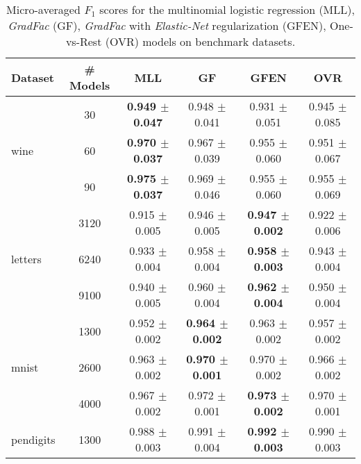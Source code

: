 \documentclass{standalone}
\begin{document}



\begin{table*}[t]
\label{exp-results}
\centering
\caption{Micro-averaged $F_{1}$ scores for the multinomial logistic regression (MLL), \emph{GradFac} (GF), \emph{GradFac} with \emph{Elastic-Net} regularization (GFEN), One-vs-Rest (OVR) models on benchmark datasets.}
\vskip 0.15in
\begin{small}
\begin{sc}
{\renewcommand{\arraystretch}{1.2}%
\begin{tabular}{|l|c|c|c|c|c|}
\hline
\abovespace\belowspace
Dataset		& \# Models 	& MLL & GF & GFEN 	& OVR  \\
\hline\hline
\multirow{3}{*}{wine}
	& 30    		& \textbf{0.949 $\pm$ 0.047} & 0.948 $\pm$ 0.041 & 0.931 $\pm$ 0.051 & 0.945 $\pm$ 0.085\\
	& 60	  		& \textbf{0.970 $\pm$ 0.037} & 0.967 $\pm$ 0.039 & 0.955 $\pm$ 0.060 & 0.951 $\pm$ 0.067\\
	& 90    		& \textbf{0.975 $\pm$ 0.037} & 0.969 $\pm$ 0.046 & 0.955 $\pm$ 0.060 & 0.955 $\pm$ 0.069\\
\hline
\multirow{3}{*}{letters}
	& 3120			& 0.915 $\pm$ 0.005 & 0.946 $\pm$ 0.005 & \textbf{0.947 $\pm$ 0.002} & 0.922 $\pm$ 0.006\\
	& 6240	 		& 0.933 $\pm$ 0.004 & 0.958 $\pm$ 0.004 & \textbf{0.958 $\pm$ 0.003} & 0.943 $\pm$ 0.004\\
	& 9100 			& 0.940 $\pm$ 0.005 & 0.960 $\pm$ 0.004 & \textbf{0.962 $\pm$ 0.004} & 0.950 $\pm$ 0.004\\
\hline
\multirow{3}{*}{mnist}
	& 1300			& 0.952 $\pm$ 0.002 & \textbf{0.964 $\pm$ 0.002} 	& 0.963 $\pm$ 0.002 			& 0.957 $\pm$ 0.002\\
	& 2600			& 0.963 $\pm$ 0.002 & \textbf{0.970 $\pm$ 0.001} 	& 0.970 $\pm$ 0.002 			& 0.966 $\pm$ 0.002\\
	& 4000			& 0.967 $\pm$ 0.002 & 0.972 $\pm$ 0.001 			& \textbf{0.973 $\pm$ 0.002} 	& 0.970 $\pm$ 0.001\\
\hline
\multirow{3}{*}{pendigits}
	& 1300			& 0.988 $\pm$ 0.003 & 0.991 $\pm$ 0.004 & \textbf{0.992 $\pm$ 0.003} & 0.990 $\pm$ 0.003 \\

\end{tabular}}
\end{sc}
\end{small}
\end{table*}
\end{document}
